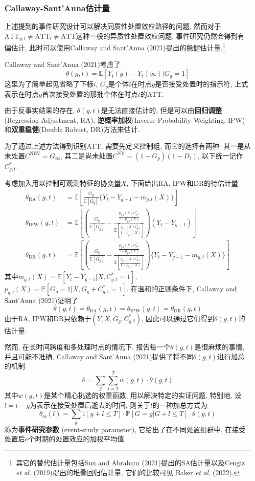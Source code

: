 \documentclass[cn,blue,14pt,screen,bibstyle=gb7714-2015]{elegantnote}
\newcommand{\E}{\mathbb{E}}
\newcommand{\X}{X}
\begin{document}
\subsubsection{Callaway-Sant'Anna估计量}
上述提到的事件研究设计可以解决同质性处置效应路径的问题, 然而对于$\text{ATT}_{g,l}\neq\text{ATT}_l\ne\text{ATT}$这种一般的异质性处置效应问题, 事件研究仍然会得到有偏估计, 此时可以使用Callaway and Sant'Anna (2021)提出的稳健估计量.\footnote{其它的替代估计量包括Sun and Abraham (2021)提出的SA估计量以及Cengiz \emph{et al.} (2019)提出的堆叠回归估计量, 它们的比较可见 Baker \emph{et al.} (2022).}

Callaway and Sant'Anna (2021)考虑了
$$\theta(g,t)=\E[Y_{t}(g)-Y_{t}(\infty)|G_g=1]$$
这里为了简单起见省略了下标$i$, $G_g$是个体$i$在时点$g$是否接受处置时的指示符, 上式表示在时点$g$首次接受处置的那批个体在时点$t$的ATT.

由于反事实结果的存在, $\theta(g,t)$是无法直接估计的, 但是可以由\textbf{回归调整}(Regression Adjustment, RA), \textbf{逆概率加权}(Inverse Probability Weighting, IPW)和\textbf{双重稳健}(Double Robust, DR)方法来估计.

为了通过上述方法得到识别ATT, 需要先定义控制组, 而它的选择有两种: 其一是从未处置$C^\text{NEV}=G_\infty$, 其二是尚未处置$C^\text{NY}=(1-G_g)(1-D_t)$, 以下统一记作$C_{g,t}^\ast$. 

考虑加入用以控制可观测特征的协变量$\X$, 下面给出RA, IPW和DR的待估计量
\begin{align*}
\theta_\text{RA}(g,t)&=\E\left[\frac{G_g}{\E[G_g]}\{Y_t-Y_{g-1}-m_{g,t}({X})\}\right] \\
\theta_\text{IPW}(g,t)&=\E\left[\left(\frac{G_g}{\E[G_g]}-\frac{\frac{p_{g,t}(\X)C_{g,t}^\ast}{1-p_{g,t}(\X)}}{\E\left[\frac{p_{g,t}(\X)C_{g,t}^\ast}{1-p_{g,t}(\X)}\right]}\right)(Y_t-Y_{g-1})\right] \\
\theta_{\text{DR}}(g,t)&=\E\left[\left(\frac{G_g}{\E[G_g]}-\frac{\frac{p_{g,t}(\X)C_{g,t}^\ast}{1-p_{g,t}(\X)}}{\E\left[\frac{p_{g,t}(\X)C_{g,t}^\ast}{1-p_{g,t}(\X)}\right]}\right)\{Y_t-Y_{g-1}-m_{g,t}(\X)\}\right]
\end{align*}
其中$m_{g,t}(X)=\E[Y_t-Y_{g-1}|X,C_{g,t}^\ast=1]$, $p_{g,t}(X)=\mathbb{P}[G_g=1|X,G_g+C_{g,t}^\ast=1]$. 在温和的正则条件下, Callaway and Sant'Anna (2021)证明了
$$\theta(g,t)=\theta_\text{RA}(g,t)=\theta_\text{IPW}(g,t)=\theta_\text{DR}(g,t)$$
由于RA, IPW和DR只依赖于$(Y,X,G_g,C_{g,t}^\ast)$, 因此可以通过它们得到$\theta(g,t)$的估计量.

然而, 在长时间跨度和多处理时点的情况下, 报告每一个$\theta(g,t)$是很麻烦的事情, 并且可能不准确, Callaway and Sant'Anna (2021)提供了将不同$\theta(g,t)$进行加总的机制
$$\theta=\sum_g\sum_{t=2}^Tw(g,t)\cdot\theta(g,t)$$
其中$w(g,t)$是某个精心挑选的权重函数, 用以解决特定的实证问题. 特别地, 设$l=t-g$为表示在接受处置后逝去的时间, 则关于$l$的一种加总方式为
$$\theta_{\text{es}}(l)=\sum_g1[g+l\leq T]\cdot\mathbb{P}[G=g|G+l\leq T]\cdot\theta(g,t)$$
称为\textbf{事件研究参数} (event-study parameter), 它给出了在不同处置组群中, 在接受处置后$e$个时期的处置效应的加权平均值.
\end{document}
